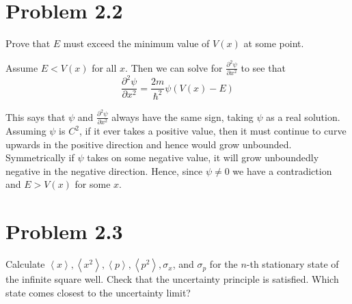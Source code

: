 \documentclass{article}
\newcommand{\dddx}[1]{\frac{\partial^2 #1}{\partial x^2}}
\newcommand{\paren}[1]{\left( #1 \right)}
\newcommand{\braket}[1]{\left\langle #1 \right\rangle}
\begin{document}
\section{Problem 2.2}
  Prove that $E$ must exceed the minimum value of $V(x)$ at some point. 

  \noindent Assume $E < V(x)$ for all $x$. Then we can solve for $\dddx{\psi}$ to see that
  $$ \dddx{\psi} = \frac{2m}{\hbar^2} \psi \paren{V(x) - E} $$

  This says that $\psi$ and $\dddx{\psi}$ always have the same sign, taking $\psi$ as a real solution.
  Assuming $\psi$ is $C^2$, if it ever takes a positive value, then it must continue to curve upwards in the positive direction and hence would grow unbounded.
  Symmetrically if $\psi$ takes on some negative value, it will grow unboundedly negative in the negative direction. 
  Hence, since $\psi \neq 0$ we have a contradiction and $E > V(x)$ for some $x$.

\section{Problem 2.3}
Calculate $\braket{x}, \braket{x^2}, \braket{p}, \braket{p^2}, \sigma_x$, and $\sigma_p$ for the $n$-th stationary state of the infinite square well.
Check that the uncertainty principle is satisfied.
Which state comes closest to the uncertainty limit?
\end{document}
